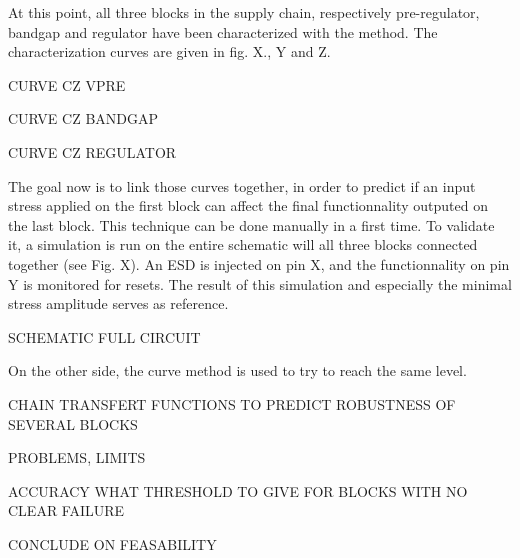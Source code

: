 At this point, all three blocks in the supply chain, respectively pre-regulator, bandgap and regulator have been characterized with the method.
The characterization curves are given in fig. X., Y and Z.

CURVE CZ VPRE

CURVE CZ BANDGAP

CURVE CZ REGULATOR

The goal now is to link those curves together, in order to predict if an input stress applied on the first block can affect the final functionnality outputed on the last block.
This technique can be done manually in a first time.
To validate it, a simulation is run on the entire schematic will all three blocks connected together (see Fig. X).
An ESD is injected on pin X, and the functionnality on pin Y is monitored for resets.
The result of this simulation and especially the minimal stress amplitude serves as reference.

SCHEMATIC FULL CIRCUIT

On the other side, the curve method is used to try to reach the same level.



CHAIN TRANSFERT FUNCTIONS TO PREDICT ROBUSTNESS OF SEVERAL BLOCKS

PROBLEMS, LIMITS

ACCURACY
WHAT THRESHOLD TO GIVE FOR BLOCKS WITH NO CLEAR FAILURE

CONCLUDE ON FEASABILITY
